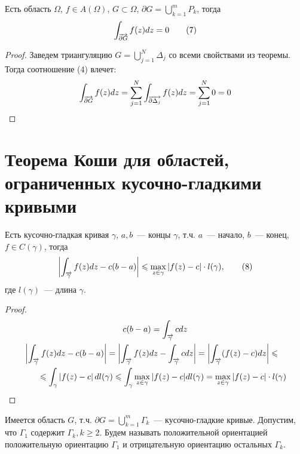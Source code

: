 \documentclass[main]{subfiles}
\begin{document}
\begin{theorem}
    Есть область $\Omega$, $f \in A (\Omega)$, $G \subset \Omega$, $\partial G = \bigcup_{k=1}^m P_k$, тогда
    \[\AnClOrInt[\AnClOrCurve[\partial G]] f(z) dz = 0 \tag{7}\]
\end{theorem}
\begin{proof}
    Заведем триангуляцию $G = \bigcup_{j=1}^N \Delta_j$ со всеми свойствами из теоремы.
    Тогда соотношение (4) влечет:
    \begin{gather*}
        \AnClOrInt[\AnClOrCurve[\partial G]] f(z) dz = \sum_{j=1}^{N} \AnClOrInt[\AnClOrCurve[\partial \Delta_j]] f(z) dz = \sum_{j=1}^{N} 0 = 0
    \end{gather*}
\end{proof}

\section{Теорема Коши для областей, ограниченных кусочно-гладкими кривыми}
\begin{lemma}
    Есть кусочно-гладкая кривая $\gamma$, $a, b$~--- концы $\gamma$, т.ч. $a$~--- начало, $b$~--- конец, $f \in C(\gamma)$, тогда
    \[\left| \AnClOrInt[\AnClOrCurve[\gamma]] f(z) dz -  c(b-a) \right| \le \max_{z \in \gamma} |f(z) - c| \cdot l(\gamma), \tag{8}\]
    где $l(\gamma)$~--- длина $\gamma$.
\end{lemma}
\begin{proof}
    \begin{gather*}
        c(b-a) = \int_{\overrightarrow{\gamma}} c dz\\
        \begin{multlined}
            \left| \AnClOrInt[\AnClOrCurve[\gamma]] f(z) dz -  c(b-a) \right| = \left| \AnClOrInt[\AnClOrCurve[\gamma]] f(z) dz - \int_{\overrightarrow{\gamma}} c dz \right| = \left| \int_{\overrightarrow{\gamma}} (f(z) - c) dz \right| \le \\
            \le \int_{\gamma}\left|f(z) -c \right| dl(\gamma) \le \int_{\gamma}\max_{z \in \gamma} |f(z) - c| dl(\gamma) = \max_{z \in \gamma} |f(z) - c| \cdot l(\gamma)
        \end{multlined}
    \end{gather*}
\end{proof}
\begin{definition}
    Имеется область $G$, т.ч. $\partial G = \bigcup_{k=1}^m \Gamma_k$~--- кусочно-гладкие кривые.
    Допустим, что $\Gamma_1$ содержит $\Gamma_k, k \ge 2$.
    Будем называть положительной ориентацией положительную ориентацию $\Gamma_1$ и отрицательную ориентацию остальных $\Gamma_k$.
\end{definition}
\end{document}

